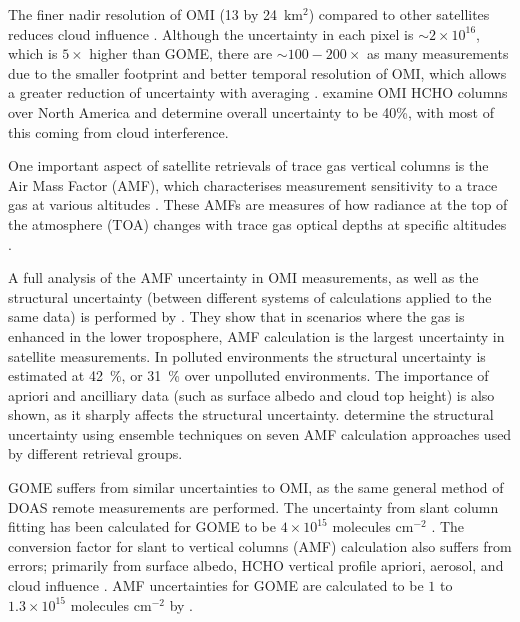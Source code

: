     The finer nadir resolution of OMI (13 by 24~km${^2}$) compared to other satellites reduces cloud influence \citep{Millet2006,Millet2008}. 
    Although the uncertainty in each pixel is $\sim 2 \times 10^{16}$, which is $5 \times$ higher than GOME, there are $\sim 100-200 \times $ as many measurements due to the smaller footprint and better temporal resolution of OMI, which allows a greater reduction of uncertainty with averaging \citep{Chance2002,Millet2008}.
    \cite{Millet2006} examine OMI HCHO columns over North America and determine overall uncertainty to be 40\%, with most of this coming from cloud interference.
    
    One important aspect of satellite retrievals of trace gas vertical columns is the Air Mass Factor (AMF), which characterises measurement sensitivity to a trace gas at various altitudes \cite[e.g.]{Palmer2001}.
    These AMFs are measures of how radiance at the top of the atmosphere (TOA) changes with trace gas optical depths at specific altitudes \citep{Lorente2017}.
    
    A full analysis of the AMF uncertainty in OMI measurements, as well as the structural uncertainty (between different systems of calculations applied to the same data) is performed by \cite{Lorente2017}.
    They show that in scenarios where the gas is enhanced in the lower troposphere, AMF calculation is the largest uncertainty in satellite measurements.
    In polluted environments the structural uncertainty is estimated at 42~\%, or 31~\% over unpolluted environments.
    The importance of apriori and ancilliary data (such as surface albedo and cloud top height) is also shown, as it sharply affects the structural uncertainty.
    \cite{Lorente2017} determine the structural uncertainty using ensemble techniques on seven AMF calculation approaches used by different retrieval groups.
    
    GOME suffers from similar uncertainties to OMI, as the same general method of DOAS remote measurements are performed.
    The uncertainty from slant column fitting has been calculated for GOME to be $4\times10^{15}$ molecules cm$^{-2}$ \citep{Chance2000, Millet2006}. 
    The conversion factor for slant to vertical columns (AMF) calculation also suffers from errors; primarily from surface albedo, HCHO vertical profile apriori, aerosol, and cloud influence \citep{Millet2006}. 
    AMF uncertainties for GOME are calculated to be $1$ to $1.3\times10^{15}$ molecules cm$^{-2}$ by \citet{Shim2005}.
    
